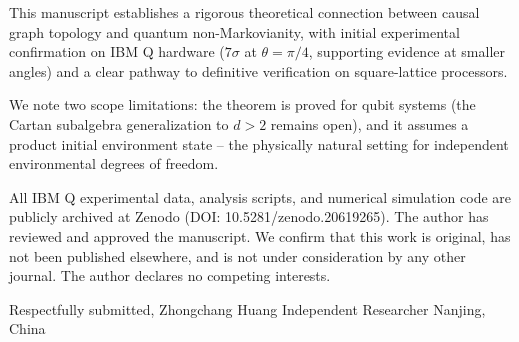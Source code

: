 This manuscript establishes a rigorous theoretical connection between causal graph topology and quantum non-Markovianity, with initial experimental confirmation on IBM Q hardware ($7\sigma$ at $\theta=\pi/4$, supporting evidence at smaller angles) and a clear pathway to definitive verification on square-lattice processors.

We note two scope limitations: the theorem is proved for qubit systems (the Cartan subalgebra generalization to $d>2$ remains open), and it assumes a product initial environment state -- the physically natural setting for independent environmental degrees of freedom.

All IBM Q experimental data, analysis scripts, and numerical simulation code are publicly archived at Zenodo (DOI: 10.5281/zenodo.20619265). The author has reviewed and approved the manuscript. We confirm that this work is original, has not been published elsewhere, and is not under consideration by any other journal. The author declares no competing interests.

Respectfully submitted,
Zhongchang Huang
Independent Researcher
Nanjing, China
